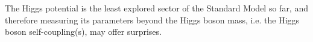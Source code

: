 The Higgs potential is the least explored sector of the Standard Model so far, and therefore measuring its parameters beyond the Higgs boson mass, i.e. the Higgs boson self-coupling(s), may offer surprises.


